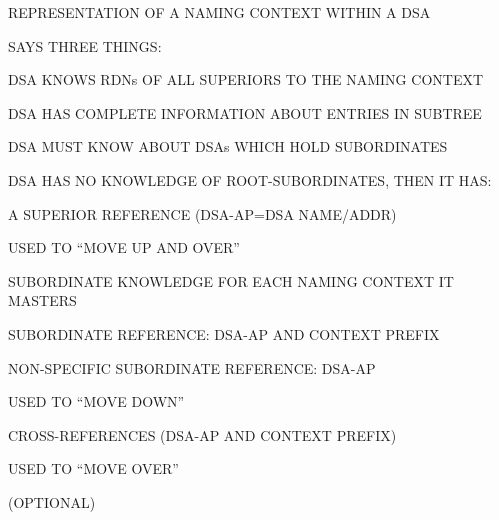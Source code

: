 \begin{bwslide}

\begin{nrtc}
\item	REPRESENTATION OF A NAMING CONTEXT WITHIN A DSA

\item	SAYS THREE THINGS:
    \begin{nrtc}
    \item	DSA KNOWS RDNs OF ALL SUPERIORS TO THE NAMING CONTEXT

    \item	DSA HAS COMPLETE INFORMATION ABOUT ENTRIES IN SUBTREE

    \item	DSA MUST KNOW ABOUT DSAs WHICH HOLD SUBORDINATES
    \end{nrtc}
\end{nrtc}
\end{bwslide}




\begin{bwslide}

\begin{nrtc}
\item	DSA HAS NO KNOWLEDGE OF ROOT-SUBORDINATES, THEN IT HAS:

\item	A SUPERIOR REFERENCE (DSA-AP=DSA NAME/ADDR)
    \begin{nrtc}
    \item	USED TO ``MOVE UP AND OVER''
    \end{nrtc}

\item	SUBORDINATE KNOWLEDGE FOR EACH NAMING CONTEXT IT MASTERS
    \begin{nrtc}
    \item	SUBORDINATE REFERENCE: DSA-AP AND CONTEXT PREFIX

    \item	NON-SPECIFIC SUBORDINATE REFERENCE: DSA-AP
    \end{nrtc}
    USED TO ``MOVE DOWN''

\item	CROSS-REFERENCES (DSA-AP AND CONTEXT PREFIX)
    \begin{nrtc}
    \item	USED TO ``MOVE OVER''
    \end{nrtc}
    (OPTIONAL)
\end{nrtc}
\end{bwslide}


